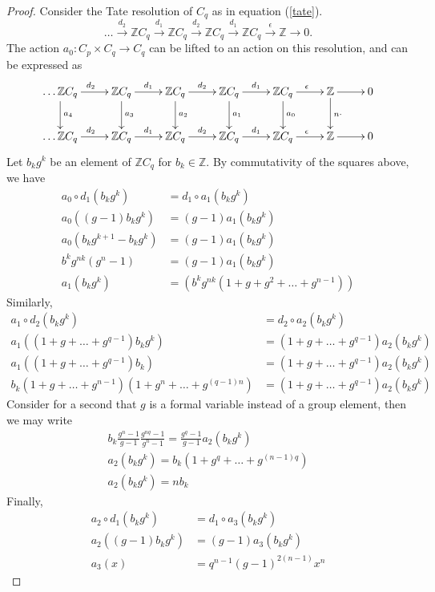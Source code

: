 \documentclass[11pt]{book}
\theoremstyle{Rem}
\theoremstyle{definition}
\numberwithin{equation}{section}
\newcommand\ZZ{\mathbb Z}
\newcommand{\ra}\rightarrow
\newcommand{\xra}\xrightarrow
\begin{document}
\begin{appendix}
\begin{proof}
Consider the Tate resolution of $C_q$ as in equation (\ref{tate}).
\[
	\dots \xra{d_2}\ZZ C_q\xra{d_1} \ZZ C_q \xra{d_2} \ZZ C_q\xra{d_1} \ZZ C_q\xra{\epsilon}\ZZ\ra 0.
\]
The action $a_0: C_p \times C_q\ra C_q$ can be lifted to an action on this resolution, and can be expressed as
	\[ \xymatrix{\dots\ZZ C_q \ar[r]^{d_2} \ar[d]^{a_4}&\ZZ C_q\ar[r]^{d_1}\ar[d]^{a_3} & \ZZ C_q \ar[r]^{d_2}\ar[d]^{a_2} & \ZZ C_q\ar[r]^{d_1}\ar[d]^{a_1} & \ZZ C_q\ar[r]^{\epsilon}\ar[d]^{a_0}& \ZZ\ar[d]^{n\cdot}\ar[r] & 0\\
\dots\ZZ C_q \ar[r]^{d_2} &\ZZ C_q\ar[r]^{d_1} & \ZZ C_q \ar[r]^{d_2} & \ZZ C_q\ar[r]^{d_1} & \ZZ C_q\ar[r]^{\epsilon}& \ZZ \ar[r]& 0}
\]
Let $b_kg^k$ be an element of $\ZZ C_q$ for $b_k \in \ZZ$. By commutativity of the squares above, we have \begin{align*}
	a_0\circ d_1(b_kg^k) &= d_1\circ a_1 (b_kg^k)\\
	a_0((g-1)b_kg^k) &= (g-1) a_1(b_kg^{k})\\
	a_0 (b_kg^{k+1} - b_kg^k) &= (g-1) a_1(b_kg^{k})\\
	b^kg^{nk}(g^n - 1) &= (g-1) a_1(b_kg^{k})\\
	a_1(b_kg^{k}) &= (b^kg^{nk}(1 + g + g^2 +\dots + g^{n-1}))
\end{align*}
Similarly,  \begin{align*}
	a_1\circ d_2(b_kg^k) &= d_2\circ a_2 (b_kg^k)\\
	a_1((1+ g + \dots + g^{q-1})b_kg^k) &= (1+ g + \dots + g^{q-1}) a_2(b_kg^k)\\
	a_1((1+ g + \dots + g^{q-1})b_k)  &= (1+ g + \dots + g^{q-1}) a_2(b_kg^k)\\
	b_k(1+g + \dots +g^{n-1})(1 + g^n + \dots + g^{(q-1)n}) &= (1+ g + \dots + g^{q-1}) a_2(b_kg^k)
\end{align*} 
Consider for a second that $g$ is a formal variable instead of a group element, then we may write \begin{align*}
b_k\frac{g^n -1 }{g-1}\frac{g^{nq} -1}{g^n -1} = \frac{g^q -1}{g-1} a_2(b_k g^k) \\
a_2(b_k g^k) = b_k (1 + g^q + \dots + g^{(n-1)q})\\
a_2(b_kg^k) = nb_k
\end{align*}
Finally,
\begin{align*}
	a_2\circ d_1(b_kg^k) &= d_1\circ a_3 (b_kg^k)\\
	a_2((g-1)b_kg^k) &= (g-1) a_3(b_kg^k)\\
	a_3(x) &= q^{n-1}(g-1)^{2(n-1)}x^n 
\end{align*}

\end{proof}
\end{appendix}
\end{document}
